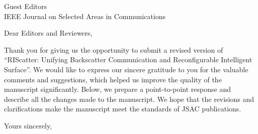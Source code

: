 \documentclass[10pt]{scrartcl}
\begin{document}

\begin{letter}{%
		Guest Editors\\
		IEEE Journal on Selected Areas in Communications
	}
	\opening{Dear Editors and Reviewers,}
	Thank you for giving us the opportunity to submit a revised version of ``RIScatter: Unifying Backscatter Communication and Reconfigurable Intelligent Surface''.
	We would like to express our sincere gratitude to you for the valuable comments and suggestions, which helped us improve the quality of the manuscript significantly.
	Below, we prepare a point-to-point response and describe all the changes made to the manuscript.
	We hope that the revisions and clarifications make the manuscript meet the standards of JSAC publications.
	\closing{Yours sincerely,}
\end{letter}
\end{document}
